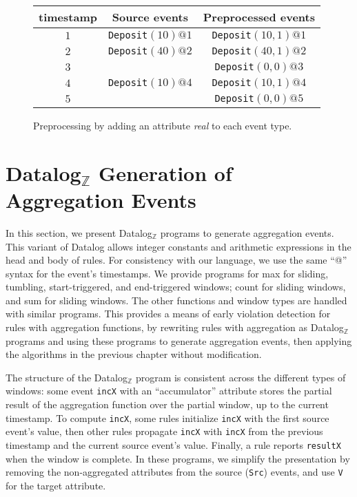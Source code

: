 \begin{figure}[h!]
  \centering
\begin{tabular}{|c|c|c|}\hline
    timestamp & Source events              & Preprocessed events        \\\hline
    $1$       & \texttt{Deposit}$(10)@1$      & \texttt{Deposit}$(10,1)@1$      \\\hline
    $2$       & \texttt{Deposit}$(40)@2$      & \texttt{Deposit}$(40,1)@2$      \\\hline
    $3$       &                           & \texttt{Deposit}$(0,0)@3$       \\\hline
    $4$       & \texttt{Deposit}$(10)@4$      & \texttt{Deposit}$(10,1)@4$      \\\hline
    $5$       &                           & \texttt{Deposit}$(0,0)@5$       \\\hline
\end{tabular}
\caption{Preprocessing by adding an attribute {\em real} to each event type.}
\label{fig:preprocessing-example}
\end{figure}

\section{Datalog$_{\mathbb{Z}}$ Generation of Aggregation Events}
\label{section:aggregation-datalog-program}

In this section,
we present Datalog$_{\mathbb{Z}}$ programs \cite{dantsin2001complexity}
to generate aggregation events.
This variant of Datalog allows integer constants and arithmetic expressions in the head and body of rules.
For consistency with our language,
we use the same ``@'' syntax for the event's timestamps.
We provide programs for
{\sc max} for sliding, tumbling,
start-triggered, and end-triggered windows;
{\sc count} for sliding windows,
and
{\sc sum} for sliding windows.
The other functions and window types are handled
with similar programs.
This provides a means of early violation detection
for rules with aggregation functions,
by rewriting rules with aggregation as Datalog$_{\mathbb{Z}}$ programs
and using these programs to generate aggregation events,
then applying the algorithms in the previous chapter without modification.

The structure of the Datalog$_{\mathbb{Z}}$ program
is consistent across the different
types of windows:
some event \texttt{incX}
with an ``accumulator'' attribute
stores the partial result of the aggregation function
over the partial window,
up to the current timestamp.
To compute \texttt{incX},
some rules initialize \texttt{incX}
with the first source event's value,
then other rules propagate \texttt{incX}
with \texttt{incX} from the previous timestamp
and the current source event's value.
Finally,
a rule reports \texttt{resultX}
when the window is complete.
In these programs,
we simplify the presentation
by removing the non-aggregated attributes
from the source ({\tt Src}) events,
and use {\tt V} for the target attribute.

